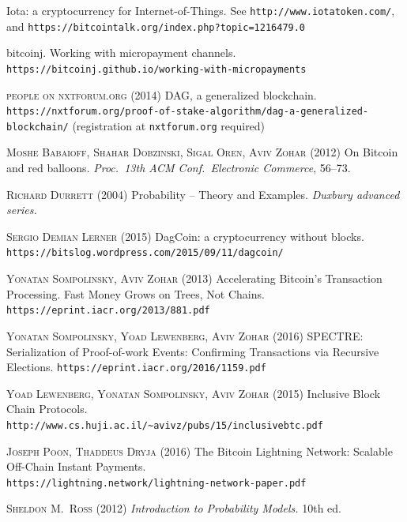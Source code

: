 \documentclass[12pt]{article}
\begin{document}
\begin{thebibliography}{9}
 Iota: a cryptocurrency for Internet-of-Things.
See \texttt{http://www.iotatoken.com/}, and
\texttt{https://bitcointalk.org/index.php?topic=1216479.0}

  bitcoinj.  
Working with micropayment channels.\\
\texttt{https://bitcoinj.github.io/working-with-micropayments}

\textsc{people on nxtforum.org}  (2014)
DAG, a generalized blockchain.
\texttt{https://nxtforum.org/proof-of-stake-algorithm/dag-a-generalized-blockchain/}  (registration at \texttt{nxtforum.org} required)

\textsc{Moshe Babaioff, Shahar Dobzinski, Sigal Oren, Aviv Zohar} (2012)
On Bitcoin and red balloons.
\textit{Proc.\ 13th ACM Conf.\ Electronic Commerce}, 56--73. 


 \textsc{Richard Durrett} (2004)
Probability -- Theory and Examples.
\textit{Duxbury advanced series.}


 \textsc{Sergio Demian Lerner} (2015)
DagCoin: a cryptocurrency without blocks.
\texttt{https://bitslog.wordpress.com/2015/09/11/dagcoin/}

 \textsc{Yonatan Sompolinsky, Aviv Zohar} (2013)
Accelerating Bitcoin's Transaction Processing.
Fast Money Grows on Trees, Not Chains.
\texttt{https://eprint.iacr.org/2013/881.pdf}

 \textsc{Yonatan Sompolinsky, Yoad Lewenberg, Aviv Zohar} (2016)
SPECTRE:
Serialization of Proof-of-work Events: Confirming Transactions via
Recursive Elections.
\texttt{https://eprint.iacr.org/2016/1159.pdf}

 \textsc{Yoad Lewenberg, Yonatan Sompolinsky, Aviv Zohar} 
(2015)
Inclusive Block Chain Protocols.\\
\texttt{http://www.cs.huji.ac.il/\textasciitilde{}avivz/pubs/15/inclusive\underline{\phantom{m}}btc.pdf}

\textsc{Joseph Poon, Thaddeus Dryja} (2016)
The Bitcoin Lightning Network:
Scalable Off-Chain Instant Payments.\\
\texttt{https://lightning.network/lightning-network-paper.pdf}

 \textsc{Sheldon M.\ Ross} (2012) 
\textit{Introduction to Probability Models.} 10th ed.


\end{thebibliography}
\end{document}
